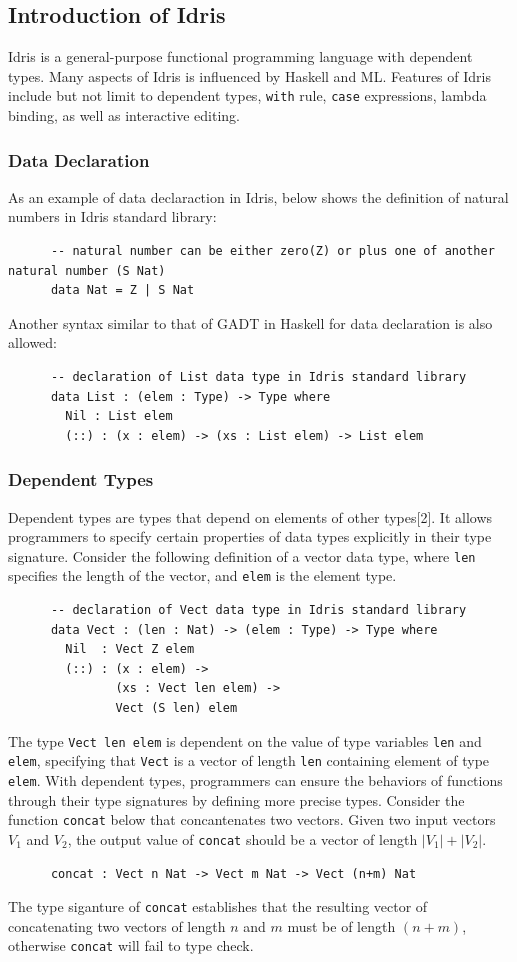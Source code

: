 \documentclass[11pt, a4paper]{article} %
\theoremstyle{definition}
\begin{document}
\subsection{Introduction of Idris}
Idris is a general-purpose functional programming language with dependent types. Many aspects of Idris is influenced by Haskell and ML. Features of Idris include but not limit to dependent types, \texttt{with} rule, \texttt{case} expressions, lambda binding, as well as interactive editing. 

\subsubsection*{Data Declaration}
As an example of data declaraction in Idris, below shows the definition of natural numbers in Idris standard library: 
\begin{lstlisting}
      -- natural number can be either zero(Z) or plus one of another natural number (S Nat)
      data Nat = Z | S Nat
\end{lstlisting}
Another syntax similar to that of GADT in Haskell for data declaration is also allowed: 
\begin{lstlisting}
      -- declaration of List data type in Idris standard library
      data List : (elem : Type) -> Type where
        Nil : List elem
        (::) : (x : elem) -> (xs : List elem) -> List elem
\end{lstlisting}

\subsubsection*{Dependent Types}
Dependent types are types that depend on elements of other types[2]. It allows programmers to specify certain properties of data types explicitly in their type signature. Consider the following definition of a vector data type, where \texttt{len} specifies the length of the vector, and \texttt{elem} is the element type. 
\begin{lstlisting}
      -- declaration of Vect data type in Idris standard library
      data Vect : (len : Nat) -> (elem : Type) -> Type where
        Nil  : Vect Z elem
        (::) : (x : elem) -> 
               (xs : Vect len elem) -> 
               Vect (S len) elem
\end{lstlisting}
The type \texttt{Vect len elem} is dependent on the value of type variables \texttt{len} and \texttt{elem}, specifying that \texttt{Vect} is a vector of length \texttt{len} containing element of type \texttt{elem}. With dependent types, programmers can ensure the behaviors of functions through their type signatures by defining more precise types. Consider the function \texttt{concat} below that concantenates two vectors. Given two input vectors $V_1$ and $V_2$, the output value of \texttt{concat} should be a vector of length $|V_1| + |V_2|$.  
\begin{lstlisting}
      concat : Vect n Nat -> Vect m Nat -> Vect (n+m) Nat
\end{lstlisting}
The type siganture of \texttt{concat} establishes that the resulting vector of concatenating two vectors of length $n$ and $m$ must be of length $(n+m)$, otherwise \texttt{concat} will fail to type check. 
\end{document}
